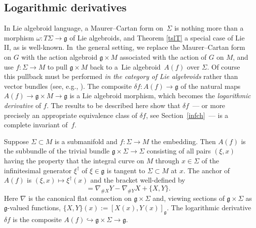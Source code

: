 \subsection*{Logarithmic derivatives}

In Lie algebroid language, a Maurer--Cartan form on~$\Sigma $ is
nothing more than a morphism
$\omega \colon {T \Sigma } \rightarrow {\mathfrak g}$ of Lie
algebroids, and Theorem \ref{tslT} a special case of Lie II, as is
well-known. In~the general setting, we replace the Maurer--Cartan form
on $G$ with the action algebroid ${\mathfrak g} \times M$ asso\-ci\-a\-ted
with the action of $G$ on $M$, and use $f \colon \Sigma \rightarrow M$
to pull ${\mathfrak g} \times M$ back to a~Lie algebroid~$A(f)$ over
$\Sigma $. Of course this pullback must be performed {\em in the
 category of Lie algebroids} rather than vector bundles (see, e.g.,
\cite[Section~4.2]{Mackenzie_05}). The composite
$ \delta f \colon A(f) \rightarrow {\mathfrak g}$ of the natural maps
$A(f) \rightarrow {\mathfrak g} \times M \rightarrow {\mathfrak g} $
is a Lie algebroid morphism, which becomes the {\it logarithmic
 derivative} of $f$. The results to be described here show that
$\delta f$~--- or more precisely an appropriate equivalence class of
$\delta f$, see Section~\ref{infch}~--- is a complete invariant of~$f$.

\begin{Example} Suppose
$\Sigma \subset M$ is a submanifold and $f \colon \Sigma \rightarrow
M$ the embedding. Then $A(f)$ is the subbundle of the trivial bundle
${\mathfrak g} \times \Sigma \rightarrow \Sigma$ consisting of all
pairs $(\xi,x)$ having the property that the integral curve on $M$
through $x \in \Sigma $ of the infinitesimal generator $\xi^\dagger$
of $\xi \in {\mathfrak g} $ is tangent to $\Sigma \subset M$ at
$x$. The anchor of $A(f)$ is $(\xi,x) \mapsto \xi^\dagger(x)$ and the
bracket well-defined by
\begin{equation*} [X,Y]=\nabla_{\#X}Y-\nabla_{\#Y}X +\{X,Y\}.
\end{equation*} Here $\nabla $ is the canonical flat connection on
${\mathfrak g} \times \Sigma$ and, viewing sections of ${\mathfrak g}
\times \Sigma $ as ${\mathfrak g} $-valued functions,
$\{X,Y\}(x):=[X(x),Y(x)]_{\mathfrak g} $. The logarithmic derivative
$\delta f$ is the composite $A(f)\hookrightarrow {\mathfrak g} \times
\Sigma \rightarrow {\mathfrak g}$.
\end{Example}

